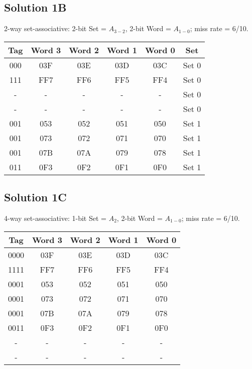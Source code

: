 \documentclass{article}
\begin{document}
\subsection*{Solution 1B} 2-way set-associative: 2-bit Set = $A_{3-2}$, 2-bit Word = $A_{1-0}$; miss rate = 6/10.

\begin{center}
\begin{tabular}{|c|c|c|c|c|c|}
\hline
Tag & Word 3 & Word 2 & Word 1 & Word 0 & Set \\\hline
000 & 03F & 03E & 03D & 03C & Set 0 \\\hline
111 & FF7 & FF6 & FF5 & FF4 & Set 0 \\\hline
 - & - & - & - & - & Set 0 \\\hline
 - & - & - & - & - & Set 0 \\\hline
001 & 053 & 052 & 051 & 050 & Set 1 \\\hline
001 & 073 & 072 & 071 & 070 & Set 1 \\\hline
001 & 07B & 07A & 079 & 078 & Set 1 \\\hline
011 & 0F3 & 0F2 & 0F1 & 0F0 & Set 1 \\\hline
\end{tabular}
\end{center}

\subsection*{Solution 1C} 4-way set-associative: 1-bit Set = $A_2$, 2-bit Word = $A_{1-0}$; miss rate = 6/10.

\begin{center}
\begin{tabular}{|c|c|c|c|c|}\hline
Tag & Word 3 & Word 2 & Word 1 & Word 0 \\\hline
0000 & 03F & 03E & 03D & 03C \\\hline
1111 & FF7 & FF6 & FF5 & FF4 \\\hline
0001 & 053 & 052 & 051 & 050 \\\hline
0001 & 073 & 072 & 071 & 070 \\\hline
0001 & 07B & 07A & 079 & 078 \\\hline
0011 & 0F3 & 0F2 & 0F1 & 0F0 \\\hline
- & - & - & - & - \\\hline
- & - & - & - & - \\\hline
\end{tabular}
\end{center}
\end{document}
